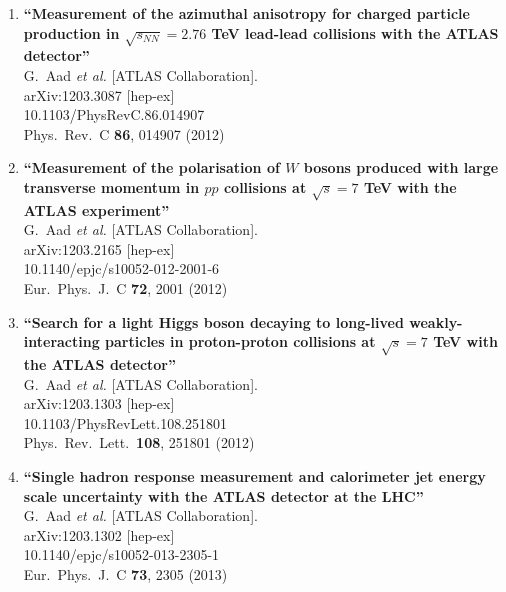 \documentclass{article}
\begin{document}
\begin{enumerate}
\item%
{\bf ``Measurement of the azimuthal anisotropy for charged particle production in $\sqrt{s_{NN}}=2.76$ TeV lead-lead collisions with the ATLAS detector''}
  \\{}G.~Aad {\it et al.}  [ATLAS Collaboration].
  \\{}arXiv:1203.3087 [hep-ex]
    \\{}10.1103/PhysRevC.86.014907
\\{}Phys.\ Rev.\ C {\bf 86}, 014907 (2012) %


\item%
{\bf ``Measurement of the polarisation of $W$ bosons produced with large transverse momentum in $pp$ collisions at $\sqrt{s}=7$ TeV with the ATLAS experiment''}
  \\{}G.~Aad {\it et al.}  [ATLAS Collaboration].
  \\{}arXiv:1203.2165 [hep-ex]
    \\{}10.1140/epjc/s10052-012-2001-6
\\{}Eur.\ Phys.\ J.\ C {\bf 72}, 2001 (2012) %


\item%
{\bf ``Search for a light Higgs boson decaying to long-lived weakly-interacting particles in proton-proton collisions at $\sqrt{s}=7$ TeV with the ATLAS detector''}
  \\{}G.~Aad {\it et al.}  [ATLAS Collaboration].
  \\{}arXiv:1203.1303 [hep-ex]
    \\{}10.1103/PhysRevLett.108.251801
\\{}Phys.\ Rev.\ Lett.\  {\bf 108}, 251801 (2012) %


\item%
{\bf ``Single hadron response measurement and calorimeter jet energy scale uncertainty with the ATLAS detector at the LHC''}
  \\{}G.~Aad {\it et al.}  [ATLAS Collaboration].
  \\{}arXiv:1203.1302 [hep-ex]
    \\{}10.1140/epjc/s10052-013-2305-1
\\{}Eur.\ Phys.\ J.\ C {\bf 73}, 2305 (2013) %



\end{enumerate}
\end{document}
